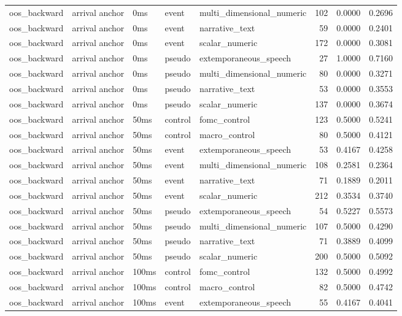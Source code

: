 \begin{tabular}{lllllrrr}
oos_backward & arrival anchor & 0ms & event & multi_dimensional_numeric & 102 & 0.0000 & 0.2696 \\
oos_backward & arrival anchor & 0ms & event & narrative_text & 59 & 0.0000 & 0.2401 \\
oos_backward & arrival anchor & 0ms & event & scalar_numeric & 172 & 0.0000 & 0.3081 \\
oos_backward & arrival anchor & 0ms & pseudo & extemporaneous_speech & 27 & 1.0000 & 0.7160 \\
oos_backward & arrival anchor & 0ms & pseudo & multi_dimensional_numeric & 80 & 0.0000 & 0.3271 \\
oos_backward & arrival anchor & 0ms & pseudo & narrative_text & 53 & 0.0000 & 0.3553 \\
oos_backward & arrival anchor & 0ms & pseudo & scalar_numeric & 137 & 0.0000 & 0.3674 \\
oos_backward & arrival anchor & 50ms & control & fomc_control & 123 & 0.5000 & 0.5241 \\
oos_backward & arrival anchor & 50ms & control & macro_control & 80 & 0.5000 & 0.4121 \\
oos_backward & arrival anchor & 50ms & event & extemporaneous_speech & 53 & 0.4167 & 0.4258 \\
oos_backward & arrival anchor & 50ms & event & multi_dimensional_numeric & 108 & 0.2581 & 0.2364 \\
oos_backward & arrival anchor & 50ms & event & narrative_text & 71 & 0.1889 & 0.2011 \\
oos_backward & arrival anchor & 50ms & event & scalar_numeric & 212 & 0.3534 & 0.3740 \\
oos_backward & arrival anchor & 50ms & pseudo & extemporaneous_speech & 54 & 0.5227 & 0.5573 \\
oos_backward & arrival anchor & 50ms & pseudo & multi_dimensional_numeric & 107 & 0.5000 & 0.4290 \\
oos_backward & arrival anchor & 50ms & pseudo & narrative_text & 71 & 0.3889 & 0.4099 \\
oos_backward & arrival anchor & 50ms & pseudo & scalar_numeric & 200 & 0.5000 & 0.5092 \\
oos_backward & arrival anchor & 100ms & control & fomc_control & 132 & 0.5000 & 0.4992 \\
oos_backward & arrival anchor & 100ms & control & macro_control & 82 & 0.5000 & 0.4742 \\
oos_backward & arrival anchor & 100ms & event & extemporaneous_speech & 55 & 0.4167 & 0.4041 \\

\end{tabular}

